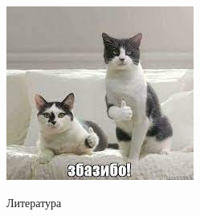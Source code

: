 \documentclass[11pt,aspectratio=169,handout]{beamer}
\begin{document}
\begin{frame}
\begin{center}
\includegraphics[scale=0.9]{images/zbazibo.jpeg}
\end{center}
\end{frame}

\begin{frame}[allowframebreaks]{Литература}




\end{frame}
\end{document}
